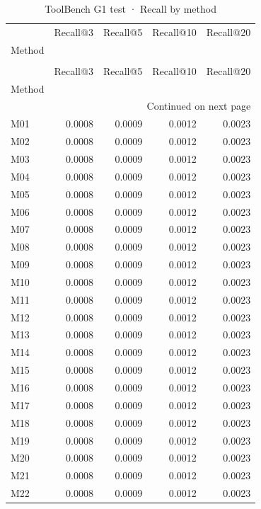 \begin{longtable}{lrrrr}
\caption{ToolBench G1 test · Recall by method} \label{tab:ToolBench-G1-test-family-family-recall} \\
\toprule
 & Recall@3 & Recall@5 & Recall@10 & Recall@20 \\
Method &  &  &  &  \\
\midrule
\endfirsthead
\caption[]{ToolBench G1 test · Recall by method} \\
\toprule
 & Recall@3 & Recall@5 & Recall@10 & Recall@20 \\
Method &  &  &  &  \\
\midrule
\endhead
\midrule
\multicolumn{5}{r}{Continued on next page} \\
\midrule
\endfoot
\bottomrule
\endlastfoot
M01 & 0.0008 & 0.0009 & 0.0012 & 0.0023 \\
M02 & 0.0008 & 0.0009 & 0.0012 & 0.0023 \\
M03 & 0.0008 & 0.0009 & 0.0012 & 0.0023 \\
M04 & 0.0008 & 0.0009 & 0.0012 & 0.0023 \\
M05 & 0.0008 & 0.0009 & 0.0012 & 0.0023 \\
M06 & 0.0008 & 0.0009 & 0.0012 & 0.0023 \\
M07 & 0.0008 & 0.0009 & 0.0012 & 0.0023 \\
M08 & 0.0008 & 0.0009 & 0.0012 & 0.0023 \\
M09 & 0.0008 & 0.0009 & 0.0012 & 0.0023 \\
M10 & 0.0008 & 0.0009 & 0.0012 & 0.0023 \\
M11 & 0.0008 & 0.0009 & 0.0012 & 0.0023 \\
M12 & 0.0008 & 0.0009 & 0.0012 & 0.0023 \\
M13 & 0.0008 & 0.0009 & 0.0012 & 0.0023 \\
M14 & 0.0008 & 0.0009 & 0.0012 & 0.0023 \\
M15 & 0.0008 & 0.0009 & 0.0012 & 0.0023 \\
M16 & 0.0008 & 0.0009 & 0.0012 & 0.0023 \\
M17 & 0.0008 & 0.0009 & 0.0012 & 0.0023 \\
M18 & 0.0008 & 0.0009 & 0.0012 & 0.0023 \\
M19 & 0.0008 & 0.0009 & 0.0012 & 0.0023 \\
M20 & 0.0008 & 0.0009 & 0.0012 & 0.0023 \\
M21 & 0.0008 & 0.0009 & 0.0012 & 0.0023 \\
M22 & 0.0008 & 0.0009 & 0.0012 & 0.0023 \\

\end{longtable}
